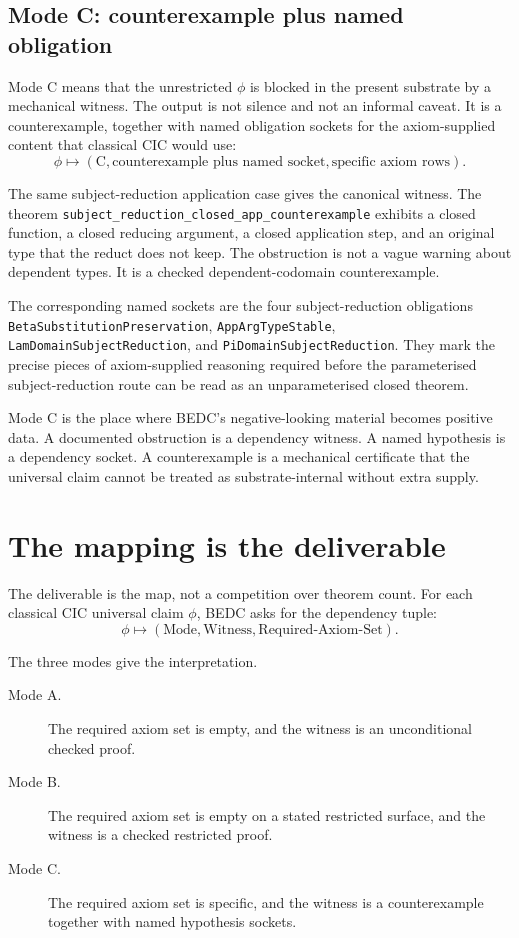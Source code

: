 \subsection{Mode C: counterexample plus named obligation}
\label{subsec:bedc-axiom-dependency-map-mode-c}

Mode C means that the unrestricted $\phi$ is blocked in the present substrate by a mechanical witness. The output is not silence and not an informal caveat. It is a counterexample, together with named obligation sockets for the axiom-supplied content that classical CIC would use:
$$
\phi \mapsto
(\mathrm{C},\text{counterexample plus named socket},\text{specific axiom rows}).
$$

The same subject-reduction application case gives the canonical witness. The theorem \texttt{subject\_reduction\_closed\_app\_counterexample} exhibits a closed function, a closed reducing argument, a closed application step, and an original type that the reduct does not keep. The obstruction is not a vague warning about dependent types. It is a checked dependent-codomain counterexample.

The corresponding named sockets are the four subject-reduction obligations \texttt{BetaSubstitutionPreservation}, \texttt{AppArgTypeStable}, \texttt{LamDomainSubjectReduction}, and \texttt{PiDomainSubjectReduction}. They mark the precise pieces of axiom-supplied reasoning required before the parameterised subject-reduction route can be read as an unparameterised closed theorem.

Mode C is the place where BEDC's negative-looking material becomes positive data. A documented obstruction is a dependency witness. A named hypothesis is a dependency socket. A counterexample is a mechanical certificate that the universal claim cannot be treated as substrate-internal without extra supply.

\section{The mapping is the deliverable}
\label{sec:bedc-axiom-dependency-map-deliverable}

The deliverable is the map, not a competition over theorem count. For each classical CIC universal claim $\phi$, BEDC asks for the dependency tuple:
$$
\phi \mapsto
(\text{Mode},\text{Witness},\text{Required-Axiom-Set}).
$$

The three modes give the interpretation.

\begin{description}
\item[Mode A.] The required axiom set is empty, and the witness is an unconditional checked proof.
\item[Mode B.] The required axiom set is empty on a stated restricted surface, and the witness is a checked restricted proof.
\item[Mode C.] The required axiom set is specific, and the witness is a counterexample together with named hypothesis sockets.
\end{description}

